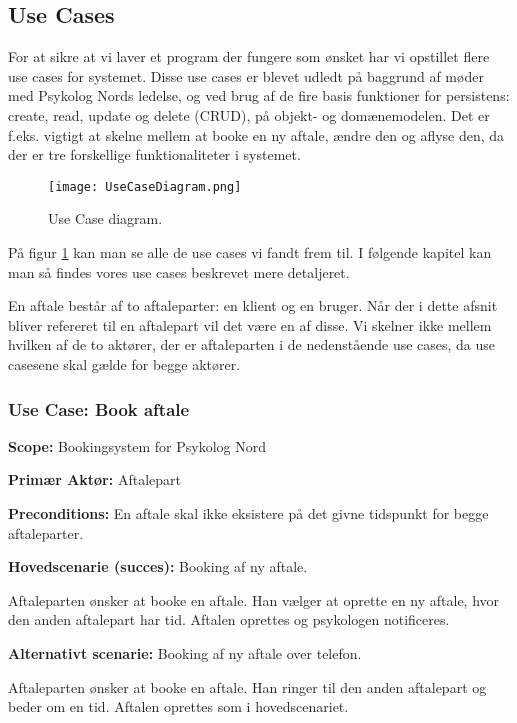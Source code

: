 \subsection{Use Cases}
For at sikre at vi laver et program der fungere som ønsket har vi opstillet flere use cases for systemet.
Disse use cases er blevet udledt på baggrund af møder med Psykolog Nords ledelse, og ved brug af de fire basis funktioner for persistens: create, read, update og delete (CRUD), på objekt- og domænemodelen. 
Det er f.eks. vigtigt at skelne mellem at booke en ny aftale, ændre den og aflyse den, da der er tre forskellige funktionaliteter i systemet.

\begin{figure}[p]
	\centering
  		\texttt{[image: UseCaseDiagram.png]}
  \caption{Use Case diagram.}
  \label{fig:UseCaseDiagram}
\end{figure}

På figur \ref{fig:UseCaseDiagram} kan man se alle de use cases vi fandt frem til. 
I følgende kapitel kan man så findes vores use cases beskrevet mere detaljeret.

En aftale består af to aftaleparter: en klient og en bruger. 
Når der i dette afsnit bliver refereret til en aftalepart vil det være en af disse. 
Vi skelner ikke mellem hvilken af de to aktører, der er aftaleparten i de nedenstående use cases, da use casesene skal gælde for begge aktører.

\subsubsection{Use Case: Book aftale}\label{usecase:bookaftale}
{\setlength{\parindent}{0cm}
\textbf{Scope:} Bookingsystem for Psykolog Nord

\textbf{Primær Aktør:} Aftalepart

\textbf{Preconditions:} En aftale skal ikke eksistere på det givne tidspunkt for begge aftaleparter.

\textbf{Hovedscenarie (succes):} Booking af ny aftale.

Aftaleparten ønsker at booke en aftale. 
Han vælger at oprette en ny aftale, hvor den anden aftalepart har tid. 
Aftalen oprettes og psykologen notificeres.

\textbf{Alternativt scenarie:} Booking af ny aftale over telefon.

Aftaleparten ønsker at booke en aftale. Han ringer til den anden aftalepart og beder om en tid. Aftalen oprettes som i hovedscenariet.
}

